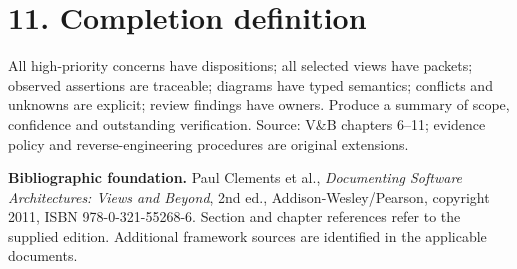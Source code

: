 \documentclass[11pt,letterpaper]{article}
\begin{document}
\section*{11. Completion definition}
All high-priority concerns have dispositions; all selected views have packets; observed assertions are traceable; diagrams have typed semantics; conflicts and unknowns are explicit; review findings have owners. Produce a summary of scope, confidence and outstanding verification. Source: V\&B chapters 6--11; evidence policy and reverse-engineering procedures are original extensions.\par\smallskip
\par\smallskip\textbf{Bibliographic foundation.} Paul Clements et al., \emph{Documenting Software Architectures: Views and Beyond}, 2nd ed., Addison-Wesley/Pearson, copyright 2011, ISBN 978-0-321-55268-6. Section and chapter references refer to the supplied edition. Additional framework sources are identified in the applicable documents.\par
\end{document}
